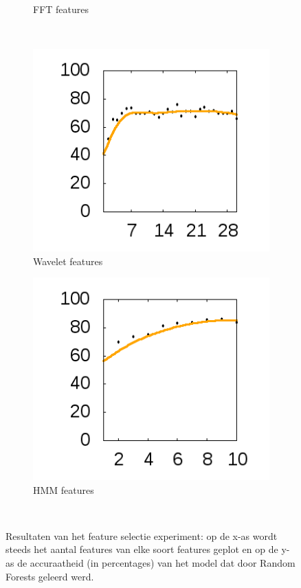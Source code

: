 \documentclass{article}
\begin{document}
\begin{figure}[htb]
\begin{subfigure}[b]{.49\linewidth}
    \caption{FFT features}\label{fig:1b}
  \end{subfigure} \\
  \begin{subfigure}[b]{.49\linewidth}
    \centering
    \includegraphics[width=.99\textwidth]{figures/DWTFeatures}
    \caption{Wavelet features}\label{fig:1c}
  \end{subfigure}
  \begin{subfigure}[b]{.49\linewidth}
    \centering
    \includegraphics[width=.99\textwidth]{figures/HMMFeatures}
    \caption{HMM features}\label{fig:1e}
  \end{subfigure} \\
  

  \caption{Resultaten van het feature selectie experiment: op de x-as wordt steeds het aantal features van elke soort features geplot en op de y-as de accuraatheid (in percentages) van het model dat door Random Forests geleerd werd.}\label{fig:1}
\end{figure}
\end{document}
